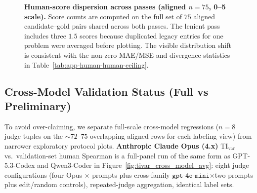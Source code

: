 \begin{figure}[t]
  \centering
  \caption{\textbf{Human-score dispersion across passes (aligned \(n=75\), 0--5 scale).} Score counts are computed on the full set of \(75\) aligned candidate--gold pairs shared across both passes.
  The lenient pass includes three \(1.5\) scores because duplicated legacy entries for one problem were averaged before plotting.
  The visible distribution shift is consistent with the non-zero MAE/MSE and divergence statistics in Table~\ref{tab:app-human-human-ceiling}.}
  \label{fig:app-human-pass-hist}
\end{figure}

\subsection{Cross-Model Validation Status (Full vs Preliminary)}
To avoid over-claiming, we separate full-scale cross-model regressions (\(n{=}8\) judge tuples on the \(\sim\!\!72\)–\(75\) overlapping aligned rows for each labeling view) from narrower exploratory protocol plots.
\textbf{Anthropic Claude Opus (4.x)} \(\mathrm{TI}_{\mathrm{var}}\) vs.\ validation-set human Spearman is a full-panel run of the same form as GPT-5.3-Codex and Qwen3-Coder in Figure~\ref{fig:tivar_cross_model_avg}: eight judge configurations (four Opus \(\times\) prompts plus cross-family \(\texttt{gpt-4o-mini}\)\(\times\)two prompts plus edit/random controls), repeated-judge aggregation, identical label sets.

